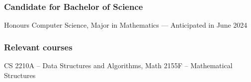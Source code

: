 \documentclass{article}
\begin{document}
\subsubsection{Candidate for Bachelor of Science} Honours Computer Science, Major in Mathematics --- Anticipated in June 2024

\subsubsection{Relevant courses} CS 2210A -- Data Structures and Algorithms, Math 2155F -- Mathematical Structures

% 
\end{document}
